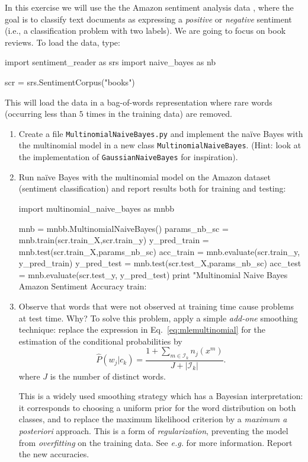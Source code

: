 \begin{exercise}
In this exercise we will use the the Amazon sentiment analysis data \citep{blitzer2007biographies}, 
where the goal is to classify text documents as expressing a \emph{positive} or \emph{negative} sentiment 
(i.e., a classification problem with two labels). We are going to focus on book reviews. 
To load the data, type:
\begin{python}
import sentiment_reader as srs
import naive_bayes as nb

scr = srs.SentimentCorpus("books")
\end{python}
This will load the data in a bag-of-words representation where rare words (occurring less than $5$ times in the training data) are removed. 

\begin{enumerate}
\item Create a file {\tt MultinomialNaiveBayes.py} and implement the na\"ive Bayes with the multinomial model in a new class
  {\tt MultinomialNaiveBayes}. (Hint: look at the implementation of {\tt GaussianNaiveBayes} for inspiration).
\item Run na\"ive Bayes with the multinomial model on the Amazon
  dataset (sentiment classification) and report results both for
  training and testing: 
    
\begin{python}
import multinomial_naive_bayes as mnbb

mnb = mnbb.MultinomialNaiveBayes()
params_nb_sc = mnb.train(scr.train_X,scr.train_y)
y_pred_train = mnb.test(scr.train_X,params_nb_sc)
acc_train = mnb.evaluate(scr.train_y, y_pred_train)
y_pred_test = mnb.test(scr.test_X,params_nb_sc)
acc_test = mnb.evaluate(scr.test_y, y_pred_test)
print "Multinomial Naive Bayes Amazon Sentiment Accuracy train: %
\end{python}


\item Observe that words that were not observed at training time cause problems at test time. Why? 
To solve this problem, apply a simple \emph{add-one} smoothing technique: replace the expression in Eq.~\ref{eq:mlemultinomial} 
for the estimation of the conditional probabilities 
by
$${\hat P}(w_j|c_k) = \frac{1+\sum_ {m \in \mathcal{I}_k} n_j(x^m)}{J + |\mathcal{I}_k|}.$$
where $J$ is the number of distinct words. 

This is a widely used smoothing strategy which has a Bayesian interpretation: it corresponds to choosing a uniform prior 
for the word distribution on both classes, and to replace the maximum likelihood criterion by a \emph{maximum a posteriori} approach. 
This is a form of \emph{regularization}, preventing the model from \emph{overfitting} on the training data. 
See \emph{e.g.} \citet{Manning1999,Manning2008} for more information. 
Report the new accuracies. 
\end{enumerate}
\end{exercise}


